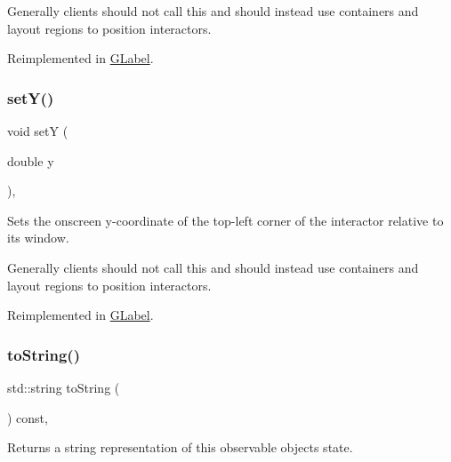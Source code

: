 Generally clients should not call this and should instead use containers and layout regions to position interactors. 

Reimplemented in \mbox{\hyperlink{classsgl_1_1GLabel_a173837ba805eaa2411e88834869d3a9c}{G\+Label}}.

\mbox{\label{classsgl_1_1GInteractor_a7d57e2a5c35d27feb58fd498a3cf82b9}} 
\subsubsection{\texorpdfstring{set\+Y()}{setY()}}
{\footnotesize\ttfamily void setY (\begin{DoxyParamCaption}\item[{double}]{y }\end{DoxyParamCaption})\hspace{0.3cm}{\ttfamily [virtual]}, {\ttfamily [inherited]}}



Sets the onscreen y-\/coordinate of the top-\/left corner of the interactor relative to its window. 

Generally clients should not call this and should instead use containers and layout regions to position interactors. 

Reimplemented in \mbox{\hyperlink{classsgl_1_1GLabel_a0b738606c7aca5c472b66c4e55b3c685}{G\+Label}}.

\mbox{\label{classsgl_1_1GObservable_a1fe5121d6528fdea3f243321b3fa3a49}} 
\subsubsection{\texorpdfstring{to\+String()}{toString()}}
{\footnotesize\ttfamily std\+::string to\+String (\begin{DoxyParamCaption}{ }\end{DoxyParamCaption}) const\hspace{0.3cm}{\ttfamily [virtual]}, {\ttfamily [inherited]}}



Returns a string representation of this observable object\textquotesingle{}s state. 


